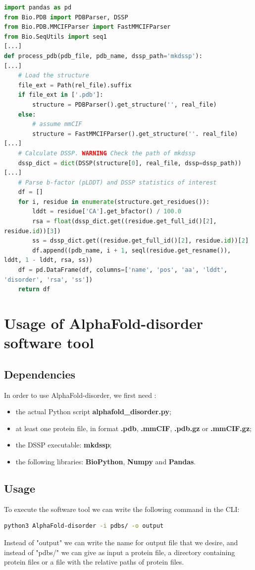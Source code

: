 \vspace{2em}

\begin{lstlisting}[language=Python, caption=Extraction\ residues'\ statistics]
import pandas as pd
from Bio.PDB import PDBParser, DSSP
from Bio.PDB.MMCIFParser import FastMMCIFParser
from Bio.SeqUtils import seq1
[...]
def process_pdb(pdb_file, pdb_name, dssp_path='mkdssp'):
[...]
    # Load the structure
    file_ext = Path(rel_file).suffix
    if file_ext in ['.pdb']:
        structure = PDBParser().get_structure('', real_file)
    else:
        # assume mmCIF
        structure = FastMMCIFParser().get_structure(''. real_file)
[...]
    # Calculate DSSP. WARNING Check the path of mkdssp
    dssp_dict = dict(DSSP(structure[0], real_file, dssp=dssp_path))
[...]
    # Parse b-factor (pLDDT) and DSSP statistics of interest
    df = []
    for i, residue in enumerate(structure.get_residues()):
        lddt = residue['CA'].get_bfactor() / 100.0
        rsa = float(dssp_dict.get((residue.get_full_id()[2], 
residue.id))[3])
        ss = dssp_dict.get((residue.get_full_id()[2], residue.id))[2]
        df.append((pdb_name, i + 1, seql(residue.get_resname()), 
lddt, 1 - lddt, rsa, ss))
    df = pd.DataFrame(df, columns=['name', 'pos', 'aa', 'lddt', 
'disorder', 'rsa', 'ss'])
    return df
\end{lstlisting}

\section{Usage of AlphaFold-disorder software tool}
\subsection{Dependencies}
In order to use AlphaFold-disorder, we first need :
\begin{itemize}
    \item the actual Python script \textbf{alphafold\_disorder.py};
    \item at least one protein file, in format \textbf{.pdb}, \textbf{.mmCIF}, \textbf{.pdb.gz} or \textbf{.mmCIF.gz};
    \item the DSSP executable: \textbf{mkdssp};
    \item the following libraries: \textbf{BioPython}, \textbf{Numpy} and \textbf{Pandas}.
\end{itemize}
\subsection{Usage}
To execute the software tool we can write the following command in the CLI:
\\
\begin{lstlisting}[language=Bash]
    python3 AlphaFold-disorder -i pdbs/ -o output
\end{lstlisting}
\vspace{1em}
Instead of "output" we can write the name for output file that we desire, and instead of "pdbs/" we can give as input a protein file, a directory containing protein files or a file with the relative paths of protein files.
\vspace{2em}
